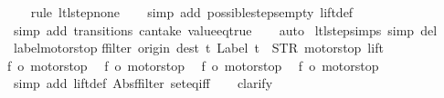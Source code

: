 \begin{isabellebody}
\ \ \isamarkupfalse%
\ {\isacharparenleft}rule\ ltl{\isacharunderscore}step{\isacharunderscore}none{\isacharparenright}\isanewline
\ \ \isamarkupfalse%
\ {\isacharparenleft}simp\ add{\isacharcolon}\ possible{\isacharunderscore}steps{\isacharunderscore}empty\ lift{\isacharunderscore}def{\isacharparenright}\isanewline
\ \ \isamarkupfalse%
\ {\isacharparenleft}simp\ add{\isacharcolon}\ transitions\ can{\isacharunderscore}take\ value{\isacharunderscore}eq{\isacharunderscore}true{\isacharparenright}\isanewline
\ \ \isamarkupfalse%
\ auto%
\endisatagproof
{\isafoldproof}%
%
\isadelimproof
\isanewline
%
\endisadelimproof
\isanewline
{}\isamarkupfalse%
\ ltl{\isacharunderscore}step{\isachardot}simps\ {\isacharbrackleft}simp\ del{\isacharbrackright}\isanewline
\isanewline
{}\isamarkupfalse%
\ label{\isacharunderscore}motorstop{\isacharcolon}\isanewline
{\isachardoublequoteopen}{\isacharparenleft}ffilter\ {\isacharparenleft}{\isasymlambda}{\isacharparenleft}{\isacharparenleft}origin{\isacharcomma}\ dest{\isacharparenright}{\isacharcomma}\ t{\isacharparenright}{\isachardot}\ Label\ t\ {\isacharequal}\ STR\ {\isacharprime}{\isacharprime}motorstop{\isacharprime}{\isacharprime}{\isacharparenright}\ lift{\isacharparenright}\ {\isacharequal}\isanewline
{\isacharbraceleft}{\isacharbar}{\isacharparenleft}{\isacharparenleft}f{}{\isacharcomma}\ o{}{\isacharparenright}{\isacharcomma}\ motorstop{}{\isacharparenright}{\isacharcomma}\isanewline
\ \ {\isacharparenleft}{\isacharparenleft}f{}{\isacharcomma}\ o{}{\isacharparenright}{\isacharcomma}\ motorstop{}{\isacharparenright}{\isacharcomma}\isanewline
\ \ {\isacharparenleft}{\isacharparenleft}f{}{\isacharcomma}\ o{}{\isacharparenright}{\isacharcomma}\ motorstop{}{\isacharparenright}{\isacharcomma}\isanewline
\ \ {\isacharparenleft}{\isacharparenleft}f{}{\isacharcomma}\ o{}{\isacharparenright}{\isacharcomma}\ motorstop{}{\isacharparenright}\isanewline
{\isacharbar}{\isacharbraceright}{\isachardoublequoteclose}\isanewline
%
\isadelimproof
\ \ %
\endisadelimproof
%
\isatagproof
{}\isamarkupfalse%
\ {\isacharparenleft}simp\ add{\isacharcolon}\ lift{\isacharunderscore}def\ Abs{\isacharunderscore}ffilter\ set{\isacharunderscore}eq{\isacharunderscore}iff{\isacharparenright}\isanewline
\ \ \isamarkupfalse%
\ clarify\isanewline
\ \ \ \isamarkupfalse%

\end{isabellebody}
